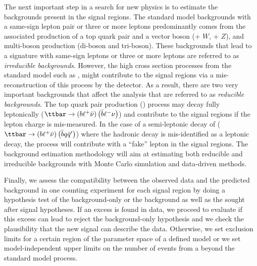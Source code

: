 The next important step in a search for new physics is to estimate the 
backgrounds present in the signal regions.
The standard model backgrounds with a same-sign lepton pair or three or more 
leptons predominantly comes
from the associated production of a top quark pair and a vector boson (\ttbar + $W$, \ttbar + $Z$), and multi-boson production (di-boson and tri-boson). 
These backgrounds that lead to a signature with same-sign leptons or three 
or more leptons are referred to as \textit{irreducible backgrounds}.
However, the high cross section processes from the standard model such as \ttbar, might contribute to the signal regions via a mis-reconstruction of this 
process by the detector. As a result, there are two very important backgrounds
 that affect the analysis that are referred to as 
\textit{reducible backgrounds}.
The top quark pair production (\ttbar) process may decay fully leptonically 
($\ttbar \to \left(b\ell^+\bar{\nu}\right)\left(\bar{b}\ell^{-}\nu\right)$) 
and contribute to the signal regions if the lepton charge is mis-measured.
In the case of a semi-leptonic decay of \ttbar 
($\ttbar \to \left(b\ell^+\bar{\nu}\right)\left(\bar{b}q \bar{q}'\right)$)
where the hadronic decay is mis-identified as a leptonic decay, 
the process will contribute with a ``fake'' lepton in the signal regions.
The background estimation methodology will aim at estimating both 
reducible and irreducible backgrounds with Monte Carlo simulation and 
data-driven methods.

Finally, we assess the compatibility between the observed data and the 
predicted background in one counting experiment for each signal region 
by doing a hypothesis test
of the background-only or the background as well as the sought 
after signal hypotheses.
If an excess is found in data, we proceed to evaluate if this excess can lead
to reject the background-only hypothesis and we check the plausibility that 
the new signal can describe the data.
Otherwise, we set exclusion limits for a certain region of the parameter 
space of a defined model or we set model-independent upper limits on the number 
of events from a beyond the standard model process. 
